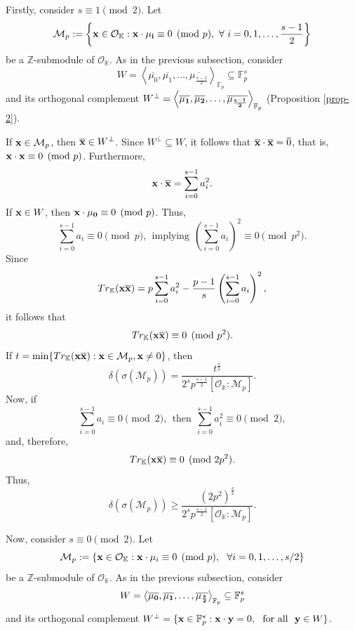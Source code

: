 \documentclass{amsart}
\begin{document}
Firstly, consider $s \equiv 1\pmod 2$. Let
\begin{equation}\label{M_p_s_1}
    \mathcal{M}_p:=\left\{{\bf x}\in\mathcal{O}_{\mathbb{K}}:{\bf x}\cdot {\bf \mu_i}\equiv 0\pmod p, \ \forall~i=0,1,\ldots,\frac{s-1}{2}\right\}
\end{equation}
be a $\mathbb{Z}$-submodule of $\mathcal{O}_{\mathbb{K}}$. As in the previous subsection, consider $$W = \left\langle\overline{\mu_0},\overline{\mu_1},\ldots,\overline{\mu_{\frac{s-1}{2}}}\right\rangle_{\mathbb{F}_p} \subseteq\mathbb{F}_p^s$$ and its orthogonal complement $W^{\perp} = \left\langle\overline{\bf \mu_1},\overline{\bf \mu_2},\ldots,\overline{\bf \mu_{\frac{s-1}{2}}}\right\rangle_{\mathbb{F}_p}$ (Proposition \ref{prop-2}).

If ${\bf x}\in\mathcal{M}_p$, then $\overline{\bf x}\in W^{\perp}$. Since $W^{\perp}\subseteq W$, it follows that $\overline{\bf x}\cdot\overline{\bf x}=\overline{0}$, that is, ${\bf x}\cdot {\bf x}\equiv 0\pmod p$. Furthermore, \[ {\bf x}\cdot \overline{\bf x} = \sum_{i=0}^{s-1}a_i^2 . \] If ${\bf x}\in W$, then ${\bf x}\cdot {\bf \mu_0}\equiv 0\pmod p$. Thus, \[ \sum_{i=0}^{s-1}a_i\equiv 0\pmod p, \ \ \mbox{implying} \ \ \left(\sum_{i=0}^{s-1}a_i\right)^2\equiv 0\pmod p^2. \] 
Since \[ Tr_{\mathbb{K}}({\bf x}\overline{\bf x}) = p\sum_{i=0}^{s-1}a_i^2 -\frac{p-1}{s}\left(\sum_{i=0}^{s-1}a_i\right)^2 ,\] it follows that \[ Tr_{\mathbb{K}}({\bf x}\overline{\bf x}) \equiv 0 \pmod {p^2}. \] If $t=\min\{Tr_{\mathbb{K}}({\bf x}\overline{\bf x}): {\bf x}\in\mathcal{M}_p, {\bf x}\neq 0\}$, then \[ \delta(\sigma(\mathcal{M}_p)) = \frac{t^{\frac{s}{2}}}{2^sp^\frac{s-1}{2}[\mathcal{O}_{\mathbb{K}}:\mathcal{M}_p]}. \] Now, if 
\[ \sum_{i=0}^{s-1}a_i\equiv 0\pmod 2, \ \ \mbox{then} \ \ \sum_{i=0}^{s-1}a_i^2\equiv 0 \pmod 2, \] and, therefore, \[ Tr_{\mathbb{K}}({\bf x}\overline{\bf x}) \equiv 0\pmod {2p^2}. \] Thus, \begin{equation} \label{eq-2} \delta(\sigma(\mathcal{M}_p)) \geq \frac{(2p^2)^{\frac{s}{2}}}{2^sp^{\frac{s-1}{2}}[\mathcal{O}_{\mathbb{K}}:\mathcal{M}_p]}. \end{equation}

Now, consider $s \equiv 0\pmod 2$. Let
\begin{equation} \label{M_p_s_0}
   \mathcal{M}_p := \{{\bf x}\in\mathcal{O}_{\mathbb{K}}:{\bf x}\cdot {\bf \mu}_i\equiv 0 \pmod{p}, \ \ \forall i=0,1,\ldots,s/2\} 
\end{equation}
\[  \] be a $\mathbb{Z}$-submodule of $\mathcal{O}_{\mathbb{K}}$.
As in the previous subsection, consider
\[  W=\left\langle\overline{\bf \mu_0},\overline{\bf \mu_1},\ldots,\overline{\bf \mu_{\frac{s}{2}}}\right\rangle_{\mathbb{F}_p} \subseteq\mathbb{F}_p^s \]
and its orthogonal complement $W^{\perp} = \{ {\bf x} \in \mathbb{F}_p^s:{\bf x}\cdot{\bf y}=0, \ \ \mbox{for all} \ \ {\bf y}\in W\}$.
\end{document}
